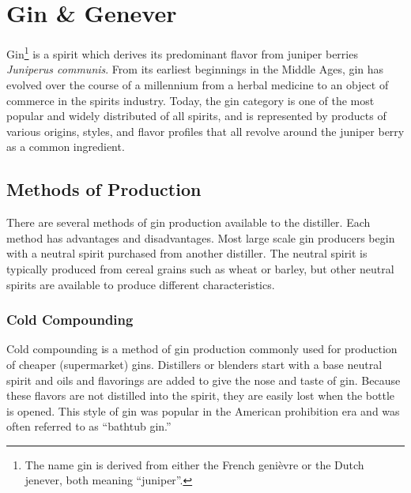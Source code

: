 \chapter{Gin \& Genever}
\clearpage
{} 
Gin\footnote{The name gin is derived from either the French genièvre or the
Dutch jenever, both meaning ``juniper''.} is a spirit which derives its
predominant flavor from juniper berries \emph{Juniperus communis}. From its
earliest beginnings in the Middle Ages, gin has evolved over the course of a
millennium from a herbal medicine to an object of commerce in the spirits
industry. Today, the gin category is one of the most popular and widely
distributed of all spirits, and is represented by products of various origins,
styles, and flavor profiles that all revolve around the juniper berry as a
common ingredient. \parencite{wiki:gin}


\section{Methods of Production} There are several methods of gin production
available to the distiller. Each method has advantages and disadvantages. Most
large scale gin producers begin with a neutral spirit purchased from another
distiller. The neutral spirit is typically produced from cereal grains such as
wheat or barley, but other neutral spirits are available to produce different
characteristics.

\subsection{Cold Compounding}
Cold compounding is a method of gin production commonly used for production of
cheaper (supermarket)  gins.  Distillers or blenders
start with a base neutral spirit and oils and flavorings are added to give the
nose and taste of gin. Because these flavors are not distilled into the spirit,
they are easily lost when the bottle is opened. This style of gin was popular
in the American prohibition era and was often referred to as ``bathtub gin.''

